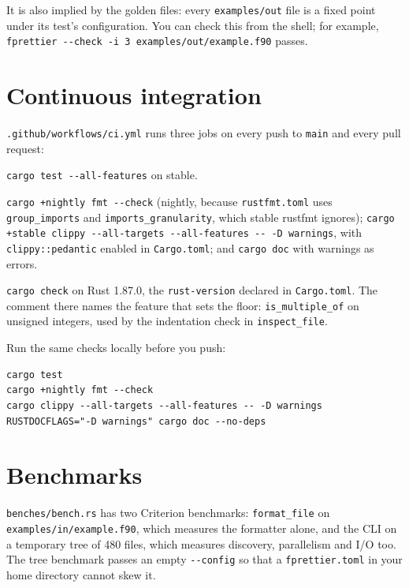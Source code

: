 \documentclass[11pt,a4paper,openany]{book}
\newcommand{\code}[1]{\texttt{\small #1}}
\newcommand{\file}[1]{\texttt{\small\color{accent}#1}}
\newcommand{\flag}[1]{\texttt{\small -{}-#1}}
\begin{document}
It is also implied by the golden files: every \file{examples/out} file is a
fixed point under its test's configuration. You can check this from the shell;
for example, \code{fprettier -{}-check -i 3 examples/out/example.f90} passes.

\section{Continuous integration}

\file{.github/workflows/ci.yml} runs three jobs on every push to \code{main}
and every pull request:

\begin{description}[font=\sffamily\small\bfseries]
  \item[Test] \code{cargo test -{}-all-features} on stable.
  \item[Lint] \code{cargo +nightly fmt -{}-check} (nightly, because
    \file{rustfmt.toml} uses \code{group\_imports} and
    \code{imports\_granularity}, which stable rustfmt ignores);
    \code{cargo +stable clippy -{}-all-targets -{}-all-features -{}- -D warnings},
    with \code{clippy::pedantic} enabled in \file{Cargo.toml}; and
    \code{cargo doc} with warnings as errors.
  \item[MSRV] \code{cargo check} on Rust 1.87.0, the \code{rust-version}
    declared in \file{Cargo.toml}. The comment there names the feature that sets
    the floor: \code{is\_multiple\_of} on unsigned integers, used by the
    indentation check in \code{inspect\_file}.
\end{description}

Run the same checks locally before you push:

\begin{lstlisting}[style=shell]
cargo test
cargo +nightly fmt --check
cargo clippy --all-targets --all-features -- -D warnings
RUSTDOCFLAGS="-D warnings" cargo doc --no-deps
\end{lstlisting}

\section{Benchmarks}

\file{benches/bench.rs} has two Criterion benchmarks: \code{format\_file} on
\file{examples/in/example.f90}, which measures the formatter alone, and the CLI on
a temporary tree of 480 files, which measures discovery, parallelism and I/O
too. The tree benchmark passes an empty \flag{config} so that a
\file{fprettier.toml} in your home directory cannot skew it.
\end{document}
